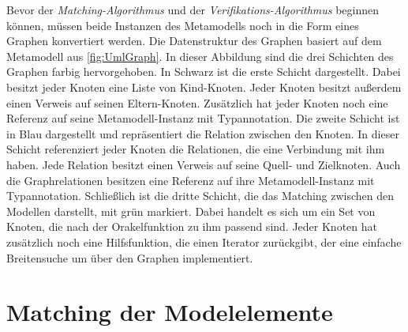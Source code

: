 Bevor der \emph{Matching-Algorithmus} und der \emph{Verifikations-Algorithmus} beginnen können, müssen beide Instanzen des Metamodells noch in die Form eines Graphen konvertiert werden.
Die Datenstruktur des Graphen basiert auf dem Metamodell aus \cref{fig:UmlGraph}.
In dieser Abbildung sind die drei Schichten des Graphen farbig hervorgehoben.
In Schwarz ist die erste Schicht dargestellt.
Dabei besitzt jeder Knoten eine Liste von Kind-Knoten.
Jeder Knoten besitzt außerdem einen Verweis auf seinen Eltern-Knoten.
Zusätzlich hat jeder Knoten noch eine Referenz auf seine Metamodell-Instanz mit Typannotation.
Die zweite Schicht ist in Blau dargestellt und repräsentiert die Relation zwischen den Knoten.
In dieser Schicht referenziert jeder Knoten die Relationen, die eine Verbindung mit ihm haben.
Jede Relation besitzt einen Verweis auf seine Quell- und Zielknoten.
Auch die Graphrelationen besitzen eine Referenz auf ihre Metamodell-Instanz mit Typannotation.
Schließlich ist die dritte Schicht, die das Matching zwischen den Modellen darstellt, mit grün markiert.
Dabei handelt es sich um ein Set von Knoten, die nach der Orakelfunktion zu ihm passend sind.
Jeder Knoten hat zusätzlich noch eine Hilfsfunktion, die einen Iterator zurückgibt, der eine einfache Breitensuche um über den Graphen implementiert.

\section{Matching der Modelelemente}
\label{sec:matching_model_elements}

